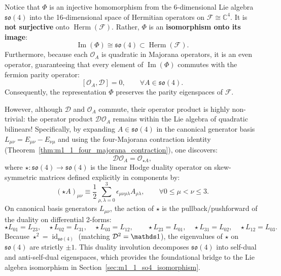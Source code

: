 \begin{remark}
\label{rem:m1_1_homomorphism_vs_isomorphism}
Notice that $\Phi$ is an injective homomorphism from the 6-dimensional Lie algebra $\mathfrak{so}(4)$ into the 16-dimensional space of Hermitian operators on $\mathcal{F} \cong \mathbb{C}^4$. It is \textbf{not surjective} onto $\operatorname{Herm}(\mathcal{F})$. Rather, $\Phi$ is an \textbf{isomorphism onto its image}:
\begin{equation}
\label{eq:m1_1_image_isomorphism}
\operatorname{Im}(\Phi) \cong \mathfrak{so}(4) \subset \operatorname{Herm}(\mathcal{F}).
\end{equation}
Furthermore, because each $\mathcal{O}_A$ is quadratic in Majorana operators, it is an even operator, guaranteeing that every element of $\operatorname{Im}(\Phi)$ commutes with the fermion parity operator:
\begin{equation}
\label{eq:m1_1_O_A_commutes_with_D}
[\mathcal{O}_A, \mathcal{D}] = 0, \qquad \forall A \in \mathfrak{so}(4).
\end{equation}
Consequently, the representation $\Phi$ preserves the parity eigenspaces of $\mathcal{F}$.

However, although $\mathcal{D}$ and $\mathcal{O}_A$ commute, their operator product is highly non-trivial: the operator product $\mathcal{D} \mathcal{O}_A$ remains within the Lie algebra of quadratic bilinears! Specifically, by expanding $A \in \mathfrak{so}(4)$ in the canonical generator basis $L_{\mu\nu} = E_{\mu\nu} - E_{\nu\mu}$ and using the four-Majorana contraction identity (Theorem~\ref{thm:m1_1_four_majorana_contraction}), one discovers:
\begin{equation}
\label{eq:m1_1_D_action_on_O_A}
\mathcal{D} \mathcal{O}_A = \mathcal{O}_{\star A},
\end{equation}
where $\star: \mathfrak{so}(4) \to \mathfrak{so}(4)$ is the linear Hodge duality operator on skew-symmetric matrices defined explicitly in components by:
\begin{equation}
\label{eq:m1_1_star_matrix_action}
(\star A)_{\mu\nu} \equiv \frac{1}{2} \sum_{\rho, \lambda=0}^3 \epsilon_{\mu\nu\rho\lambda} A_{\rho\lambda}, \qquad \forall 0 \le \mu < \nu \le 3.
\end{equation}
On canonical basis generators $L_{\mu\nu}$, the action of $\star$ is the pullback/pushforward of the duality on differential 2-forms:
\begin{equation}
\label{eq:m1_1_star_on_generators}
\star L_{01} = L_{23}, \quad \star L_{02} = L_{31}, \quad \star L_{03} = L_{12}, \qquad \star L_{23} = L_{01}, \quad \star L_{31} = L_{02}, \quad \star L_{12} = L_{03}.
\end{equation}
Because $\star^2 = \operatorname{id}_{\mathfrak{so}(4)}$ (matching $\mathcal{D}^2 = \Id$), the eigenvalues of $\star$ on $\mathfrak{so}(4)$ are strictly $\pm 1$. This duality involution decomposes $\mathfrak{so}(4)$ into self-dual and anti-self-dual eigenspaces, which provides the foundational bridge to the Lie algebra isomorphism in Section~\ref{sec:m1_1_so4_isomorphism}.
\end{remark}

